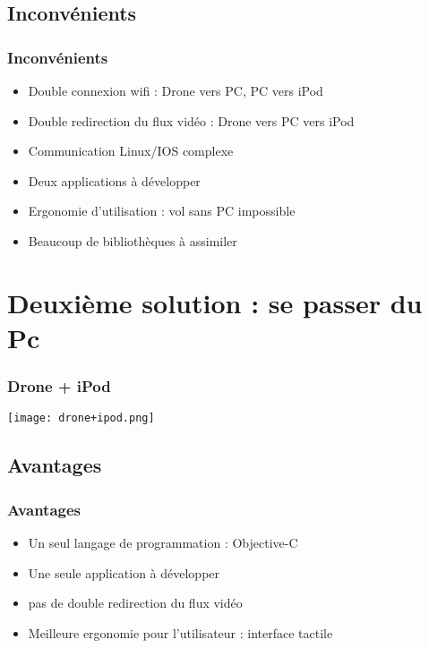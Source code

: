 \documentclass[11pt]{beamer}
\begin{document}
\subsection{Inconvénients}
\begin{frame}
\frametitle{Inconvénients}
\begin{itemize}

\item Double connexion wifi : Drone vers PC, PC vers iPod %
    
\item Double redirection du flux vidéo : Drone vers PC vers iPod %

\item Communication Linux/IOS complexe %

\item Deux applications à développer %

\item Ergonomie d'utilisation : vol sans PC impossible%

\item Beaucoup de bibliothèques à assimiler %
\end{itemize}
\end{frame}


\section{Deuxième solution : se passer du Pc}
\begin{frame}
\frametitle{Drone + iPod}
\begin{center}
\texttt{[image: drone+ipod.png]}
\end{center}
\end{frame}


\subsection{Avantages}
\begin{frame}
\frametitle{Avantages}
\begin{itemize}
    \item Un seul langage de programmation : Objective-C %
    
    \item Une seule application à développer %
    
    \item pas de double redirection du flux vidéo %
    
    \item Meilleure ergonomie pour l'utilisateur : interface tactile%
  \end{itemize}
\end{frame}
\end{document}
